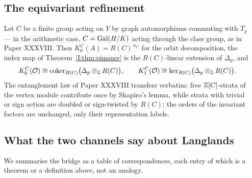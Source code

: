 \subsection{The equivariant refinement}

\begin{proposition}\label{I:prop:equivariant}
Let $C$ be a finite group acting on $Y$ by graph automorphisms commuting with $T_p$ ---
in the arithmetic case, $C=\operatorname{Gal}(H/K)$ acting through the class group, as in Paper
XXXVIII. Then $K_0^C(A)=R(C)^{\,n_C}$ for the orbit decomposition, the index map of
Theorem~\ref{I:thm:pimsner} is the $R(C)$-linear extension of $\Delta_p$, and
\[
K_0^C(\mathcal{O})\cong\operatorname{coker}_{R(C)}\bigl(\Delta_p\otimes_{\mathbb{Z}} R(C)\bigr),
\qquad
K_1^C(\mathcal{O})\cong\ker_{R(C)}\bigl(\Delta_p\otimes_{\mathbb{Z}} R(C)\bigr).
\]
The entanglement law of Paper XXXVIII transfers verbatim: free $\mathbb{Z}[C]$-strata of the
vertex module contribute once by Shapiro's lemma, while strata with trivial or sign
action are doubled or sign-twisted by $R(C)$; the orders of the invariant factors are
unchanged, only their representation labels.
\end{proposition}

\subsection{What the two channels say about Langlands}

We summarise the bridge as a table of correspondences, each entry of which is a theorem
or a definition above, not an analogy.

